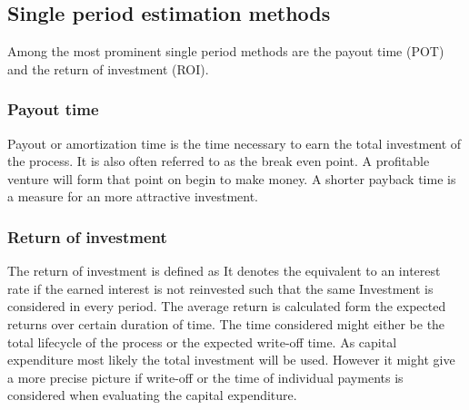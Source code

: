 \subsection{Single period estimation methods}
\label{sec:SinglePeriod}
Among the most prominent single period methods are the payout time (POT) and the return of 
investment (ROI). 

\subsubsection{Payout time}
Payout or amortization  time is the time necessary to earn the total investment of the process. It is also 
often referred to as the break even point. A profitable venture will form that point on begin to make money. 
A shorter payback time is a measure for an more attractive investment. 
\subsubsection{Return of investment}
The return of investment is defined as 
%
It denotes the equivalent to an interest rate if the earned interest is not reinvested such that the same 
Investment is considered in every period. The average return is calculated form the expected returns 
over certain duration of time. The time considered might either be the total lifecycle of the process or 
the expected write-off time. As capital expenditure most likely the total investment will be used. However
it might give a more precise picture if write-off or the time of individual payments is considered when 
evaluating the capital expenditure. 

